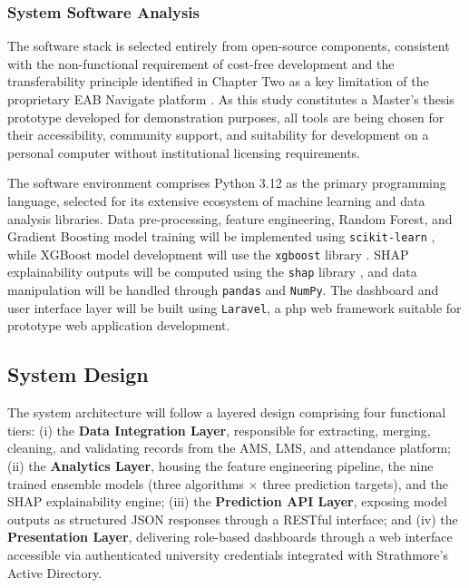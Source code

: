 \documentclass[12pt]{report}
\begin{document}
\subsubsection{System Software Analysis}

The software stack is selected entirely from open-source components, 
consistent with the non-functional requirement of cost-free development 
and the transferability principle identified in Chapter Two as a key 
limitation of the proprietary EAB Navigate platform 
\parencite{wan2019predictive}. As this study constitutes a Master's thesis 
prototype developed for demonstration purposes, all tools are being chosen for 
their accessibility, community support, and suitability for development on 
a personal computer without institutional licensing requirements.

The software environment comprises Python 3.12 as the primary programming 
language, selected for its extensive ecosystem of machine learning and data 
analysis libraries. Data pre-processing, feature engineering, Random Forest, 
and Gradient Boosting model training will be implemented using 
\texttt{scikit-learn} \parencite{pedregosa2011scikit}, while XGBoost model 
development will use the \texttt{xgboost} library \parencite{chen2016}. 
SHAP explainability outputs will be computed using the \texttt{shap} library 
\parencite{lundberg2017unified}, and data manipulation will be handled 
through \texttt{pandas} and \texttt{NumPy}. The dashboard and user interface 
layer will be built using \texttt{Laravel}, a php web framework 
suitable for prototype web application development. 

\subsection{System Design}
\label{sec:system_design}

The system architecture will follow a layered design comprising four functional tiers:
(i) the \textbf{Data Integration Layer}, responsible for extracting, merging,
cleaning, and validating records from the AMS, LMS, and attendance platform;
(ii) the \textbf{Analytics Layer}, housing the feature engineering pipeline,
the nine trained ensemble models (three algorithms $\times$ three prediction
targets), and the SHAP explainability engine; (iii) the \textbf{Prediction API
Layer}, exposing model outputs as structured JSON responses through a RESTful
interface; and (iv) the \textbf{Presentation Layer}, delivering role-based
dashboards through a web interface accessible via authenticated university
credentials integrated with Strathmore's Active Directory.
\end{document}
